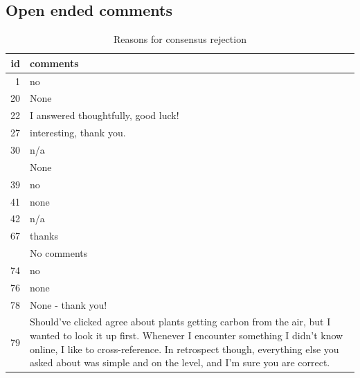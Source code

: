 \documentclass[
  doc,floatsintext]{apa6}
\begin{document}
\subsection{Open ended comments}\label{open-ended-comments}

\begin{longtable}[t]{>{}r>{\raggedright\arraybackslash}p{40em}}
\caption{\label{tab:unnamed-chunk-29}Reasons for consensus rejection}\\
\toprule
id & comments\\
\midrule
1 & no\\
20 & None\\
22 & I answered thoughtfully, good luck!\\
27 & interesting, thank you.\\
30 & n/a\\
\addlinespace
32 & None\\
39 & no\\
41 & none\\
42 & n/a\\
67 & thanks\\
\addlinespace
69 & No comments\\
74 & no\\
76 & none\\
78 & None - thank you!\\
79 & Should've clicked agree about plants getting carbon from the air, but I wanted to look it up first. Whenever I encounter something I didn't know online, I like to cross-reference. In retrospect though, everything else you asked about was simple and on the level, and I'm sure you are correct.


\end{longtable}
\end{document}
